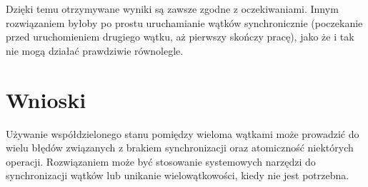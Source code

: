 \documentclass{article}
\begin{document}
Dzięki temu otrzymywane wyniki są zawsze zgodne z oczekiwaniami. Innym rozwiązaniem byłoby po prostu uruchamianie
wątków synchronicznie (poczekanie przed uruchomieniem drugiego wątku, aż pierwszy skończy pracę), jako że i tak nie
mogą działać prawdziwie równolegle.

\section{Wnioski}

Używanie współdzielonego stanu pomiędzy wieloma wątkami może prowadzić do wielu błędów związanych
z brakiem synchronizacji oraz atomiczność niektórych operacji. Rozwiązaniem może być stosowanie 
systemowych narzędzi do synchronizacji wątków lub unikanie wielowątkowości, kiedy nie jest potrzebna.
\end{document}
